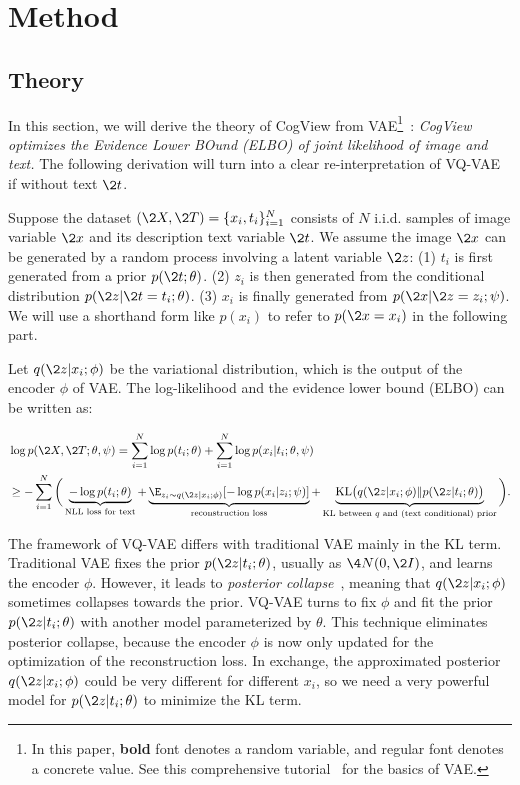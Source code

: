 \section{Method}

\subsection{Theory}
In this section, we will derive the theory of CogView from VAE\footnote{In this paper, \textbf{bold} font denotes a random variable, and regular font denotes a concrete value.
\ifblind
\else See this comprehensive tutorial~\cite{dingroad} for the basics of VAE.
\fi
 }~\cite{kingma2013auto}: \emph{CogView optimizes the Evidence Lower BOund (ELBO) of joint likelihood of image and text.} The following derivation will turn into a clear re-interpretation of VQ-VAE if without text $\2t$.

Suppose the dataset $(\2{X},\2T)=\{x_i, t_i\}_{i=1}^N$ consists of $N$ i.i.d. samples of image variable $\2x$ and its description text variable $\2t$. We assume the image $\2x$ can be generated by a random process involving a latent variable $\2z$: (1) $t_i$ is first generated from a prior $p(\2t;\theta)$. (2) $z_i$ is then generated from the conditional distribution $p(\2z|\2t=t_i;\theta)$. (3) $x_i$ is finally generated from $p(\2x|\2z=z_i;\psi)$. We will use a shorthand form like $p(x_i)$ to refer to $p(\2x=x_i)$ in the following part.

Let $q(\2z|x_i;\phi)$ be the variational distribution, which is the output of the encoder $\phi$ of VAE. The log-likelihood and the evidence lower bound (ELBO) can be written as:

\begin{align}
  &\log p(\2{X},\2T;\theta,\psi)=\sum_{i=1}^N\log p(t_i;\theta) + \sum_{i=1}^N\log p(x_i|t_i;\theta,\psi)\\
  &\geq-\sum_{i=1}^N\bigg(\underbrace{-\log p(t_i;\theta)}_{\text{NLL loss for text}}
  +\underbrace{\E_{z_i\sim q(\2z|x_i;\phi)}[-\log p(x_i|z_i;\psi)]}_{\text{reconstruction loss}} + \underbrace{\text{KL}\big(q(\2z|x_i;\phi)\|p(\2z|t_i;\theta)\big)}_{\text{KL between $q$ and (text conditional) prior}}\bigg).\label{eq:elbo}
\end{align}

The framework of VQ-VAE differs with traditional VAE mainly in the KL term. Traditional VAE fixes the prior $p(\2z|t_i; \theta)$, usually as $\4{N}(0,\2I)$, and learns the encoder $\phi$. However, it leads to \emph{posterior collapse}~\cite{he2018lagging}, meaning that $q(\2z|x_i;\phi)$ sometimes collapses towards the prior. VQ-VAE turns to fix $\phi$ and fit the prior $p(\2z|t_i; \theta)$ with another model parameterized by $\theta$. This technique eliminates posterior collapse, because the encoder $\phi$ is now only updated for the optimization of the reconstruction loss. In exchange, the approximated posterior $q(\2z|x_i;\phi)$ could be very different for different $x_i$, so we need a very powerful model for $p(\2z|t_i; \theta)$ to minimize the KL term.

